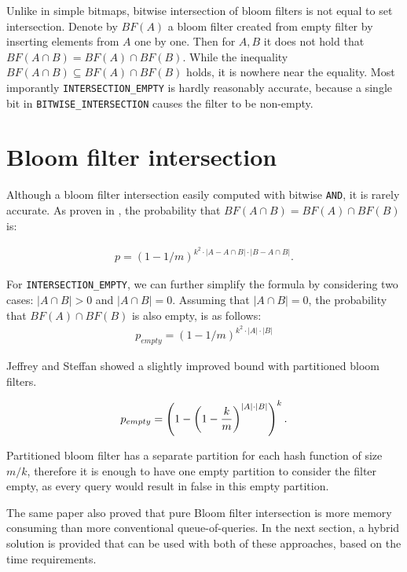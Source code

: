Unlike in simple bitmaps, bitwise intersection of bloom filters is not equal to
set intersection.  Denote by $BF(A)$ a bloom filter created from empty
filter by inserting elements from $A$ one by one. Then for $A,B$ it does not
hold that $BF(A \cap B) = BF(A) \cap BF(B)$. While the inequality $BF(A \cap B)
\subseteq BF(A) \cap BF(B)$ holds, it is nowhere near the equality. Most
imporantly {\tt INTERSECTION\_EMPTY} is hardly reasonably accurate, because a
single bit in {\tt BITWISE\_INTERSECTION} causes the filter to be non-empty. 

\section{Bloom filter intersection}

Although a bloom filter intersection easily computed with bitwise {\tt AND},
it is rarely accurate. As proven in \cite{bose2008false}, the probability that
$BF(A\cap B) = BF(A) \cap BF(B)$ is:

\begin{align*}
	p = (1-1/m)^{k^2\cdot |A-A\cap B| \cdot |B - A\cap B|} \mathrm{.}
\end{align*}

\noindent For {\tt INTERSECTION\_EMPTY}, we can further simplify the formula by
considering two cases: $|A \cap B| > 0$ and $|A \cap B| = 0$. Assuming that
$|A\cap B| = 0$, the probability that $BF(A) \cap BF(B)$ is also empty, is as
follows:
\begin{align*}
	p_{empty} = (1-1/m)^{k^2 \cdot |A| \cdot |B|}
\end{align*}

Jeffrey and Steffan \cite{Jeffrey2011} showed a slightly improved bound with
partitioned bloom filters.

\begin{align*}
	p_{empty} = \left(1 - \left( 1 - {k \over m}\right)^{|A|\cdot |B|}\right)^k \mathrm{.}
\end{align*}

Partitioned bloom filter has a separate partition for each hash function of size
$m/k$, therefore it is enough to have one empty partition to consider the filter
empty, as every query would result in false in this empty partition.

The same paper also proved that pure Bloom filter intersection is more
memory consuming than more conventional queue-of-queries. In the next section,
a hybrid solution is provided that can be used with both of these approaches,
based on the time requirements.

